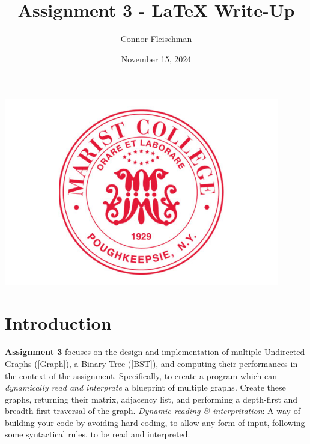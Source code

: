 \documentclass[12pt, letterpaper]{article}
\title{Assignment 3 - LaTeX Write-Up}
\author{Connor Fleischman}
\date{November 15, 2024}
\begin{document}
\maketitle
\begin{center}
   \includegraphics[width=120mm,scale=0.5]{MaristSeal.png}
\end{center}
\newpage

\tableofcontents
\newpage
\setcounter{page}{1} %

\section{Introduction}
\textbf{Assignment 3} focuses on the design and implementation of multiple Undirected Graphs (\ref{Graph}), a Binary Tree (\ref{BST}), and computing their performances in the context of the assignment.
Specifically, to create a program which can \textit{dynamically read and interprate} a blueprint of multiple graphs.
Create these graphs, returning their matrix, adjacency list, and performing a depth-first and breadth-first traversal of the graph.
\vspace*{5px}
\newline
\textit{Dynamic reading \& interpritation}: A way of building your code by avoiding hard-coding, to allow any form of input, following some syntactical rules, to be read and interpreted. 
\end{document}
